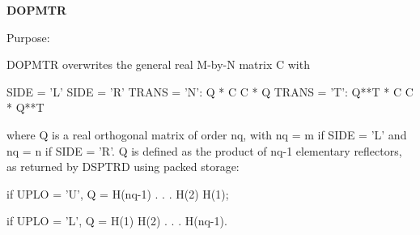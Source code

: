 {\bfseries D\+O\+P\+M\+T\+R} 

 \begin{DoxyParagraph}{Purpose\+: }
\begin{DoxyVerb} DOPMTR overwrites the general real M-by-N matrix C with

                 SIDE = 'L'     SIDE = 'R'
 TRANS = 'N':      Q * C          C * Q
 TRANS = 'T':      Q**T * C       C * Q**T

 where Q is a real orthogonal matrix of order nq, with nq = m if
 SIDE = 'L' and nq = n if SIDE = 'R'. Q is defined as the product of
 nq-1 elementary reflectors, as returned by DSPTRD using packed
 storage:

 if UPLO = 'U', Q = H(nq-1) . . . H(2) H(1);

 if UPLO = 'L', Q = H(1) H(2) . . . H(nq-1).\end{DoxyVerb}
 
\end{DoxyParagraph}

